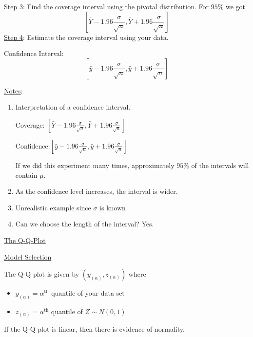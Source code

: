 \underline{Step 3}: Find the coverage interval using the pivotal distribution.
For $ 95\% $ we got
\[ \left[ \bar{Y}-1.96\frac{\sigma}{\sqrt{n}},
        \bar{Y}+1.96\frac{\sigma}{\sqrt{n}}\right] \] \underline{Step 4}: Estimate
the coverage interval using your data.

Confidence Interval:
\[ \left[ \bar{y}-1.96\frac{\sigma}{\sqrt{n}},
        \bar{y}+1.96\frac{\sigma}{\sqrt{n}}\right] \]

\underline{Notes}:
\begin{enumerate}[label=(\roman*)]
    \item Interpretation of a confidence interval.

          Coverage: $ \left[ \bar{Y}-1.96\frac{\sigma}{\sqrt{n}},
                  \bar{Y}+1.96\frac{\sigma}{\sqrt{n}}\right] $

          Confidence:$ \left[ \bar{y}-1.96\frac{\sigma}{\sqrt{n}},
                  \bar{y}+1.96\frac{\sigma}{\sqrt{n}}\right] $

          If we did this experiment many times, approximately $ 95\% $ of the
          intervals will contain $ \mu $.

    \item As the confidence level increases, the interval is wider.
    \item Unrealistic example since $ \sigma $ is known
    \item Can we choose the length of the interval? Yes.
\end{enumerate}

\underline{The Q-Q-Plot}

\underline{Model Selection}

The Q-Q plot is given by $ (y_{(\alpha)},z_{(\alpha)}) $ where
\begin{itemize}
    \item $ y_{(\alpha)} = \alpha^{\text{th}} $ quantile of your data set
    \item $ z_{(\alpha)} = \alpha^{\text{th}}  $ quantile of $ Z \sim
              N(0,1) $
\end{itemize}
If the Q-Q plot is linear, then there is evidence of normality.

